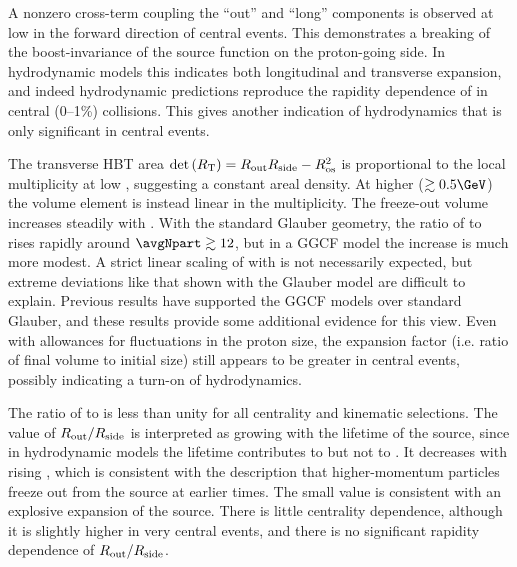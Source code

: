 A nonzero cross-term \Rol coupling the ``out'' and ``long'' components is observed at low \kt in the forward direction of central events.
This demonstrates a breaking of the boost-invariance of the source function on the proton-going side.
In hydrodynamic models this indicates both longitudinal and transverse expansion, and indeed hydrodynamic predictions reproduce the rapidity dependence of \Rol in central (0--1\%) collisions.
This gives another indication of hydrodynamics that is only significant in central events.

The transverse HBT area $\mathrm{det}\left(R_\mathrm{T}\right) = R_{\mathrm{out}} R_{\mathrm{side}} - R_{\mathrm{os}}^2$ is proportional to the local multiplicity \dNdy at low \kt, suggesting a constant areal density.
At higher \kt ($\gtrsim 0.5 \GeV$) the volume element \detR is instead linear in the multiplicity.
The freeze-out volume increases steadily with \avgNpart.
With the standard Glauber geometry, the ratio of \detR to \Npart rises rapidly around $\avgNpart \gtrsim 12$, but in a \ac{GGCF} model the increase is much more modest.
A strict linear scaling of \detR with \avgNpart is not necessarily expected, but extreme deviations like that shown with the Glauber model are difficult to explain.
Previous results have supported the \ac{GGCF} models over standard Glauber, and these results provide some additional evidence for this view.
Even with allowances for fluctuations in the proton size, the expansion factor (i.e. ratio of final volume to initial size) still appears to be greater in central events, possibly indicating a turn-on of hydrodynamics.

The ratio of \Rout to \Rside is less than unity for all centrality and kinematic selections.
The value of $R_{\mathrm{out}}/R_{\mathrm{side}}$ is interpreted as growing with the lifetime of the source, since in hydrodynamic models the lifetime contributes to \Rout but not to \Rside.
It decreases with rising \kt, which is consistent with the description that higher-momentum particles freeze out from the source at earlier times.
The small value is consistent with an explosive expansion of the source.
There is little centrality dependence, although it is slightly higher in very central events, and there is no significant rapidity dependence of $R_{\mathrm{out}}/R_{\mathrm{side}}$.


